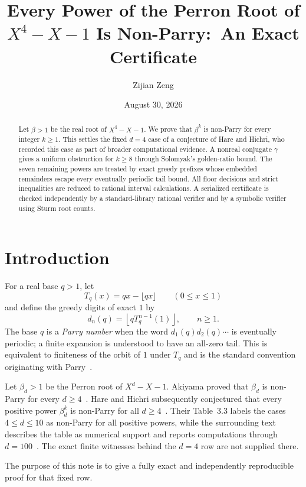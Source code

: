 \documentclass[11pt]{amsart}
\title[Non-Parry powers of the quartic Perron root]{Every Power of the Perron Root of
\texorpdfstring{$X^4-X-1$}{X4-X-1} Is Non-Parry:\ An Exact Certificate}
\author{Zijian Zeng}
\date{August 30, 2026}
\theoremstyle{definition}
\begin{document}
\begin{abstract}
Let $\beta>1$ be the real root of $X^4-X-1$.  We prove that
$\beta^k$ is non-Parry for every integer $k\geq 1$.  This settles the fixed
$d=4$ case of a conjecture of Hare and Hichri, who recorded this case as part
of broader computational evidence.  A nonreal conjugate $\gamma$ gives a
uniform obstruction for $k\geq 8$ through Solomyak's golden-ratio bound.  The
seven remaining powers are treated by exact greedy prefixes whose embedded
remainders escape every eventually periodic tail bound.  All floor decisions
and strict inequalities are reduced to rational interval calculations.  A
serialized certificate is checked independently by a standard-library
rational verifier and by a symbolic verifier using Sturm root counts.
\end{abstract}

\maketitle

\section{Introduction}

For a real base $q>1$, let
\[
T_q(x)=qx-\lfloor qx\rfloor \qquad (0\leq x\leq 1)
\]
and define the greedy digits of exact $1$ by
\[
d_n(q)=\left\lfloor qT_q^{n-1}(1)\right\rfloor,\qquad n\geq 1.
\]
The base $q$ is a \emph{Parry number} when the word
$d_1(q)d_2(q)\cdots$ is eventually periodic; a finite expansion is understood
to have an all-zero tail.  This is equivalent to finiteness of the orbit of
$1$ under $T_q$ and is the standard convention originating with
Parry~\cite{Parry1960}.

Let $\beta_d>1$ be the Perron root of $X^d-X-1$.  Akiyama proved that
$\beta_d$ is non-Parry for every $d\geq 4$~\cite[Theorem~1.1]{Akiyama2016}.
Hare and Hichri subsequently conjectured that every positive power
$\beta_d^k$ is non-Parry for all $d\geq 4$~\cite[Conjecture~3.3]{HareHichri2026}.
Their Table~3.3 labels the cases $4\leq d\leq 10$ as non-Parry for all positive
powers, while the surrounding text describes the table as numerical support
and reports computations through $d=100$~\cite[Table~3.3 and
Remark~3.4]{HareHichri2026}.  The exact finite witnesses behind the $d=4$ row
are not supplied there.

The purpose of this note is to give a fully exact and independently
reproducible proof for that fixed row.
\end{document}
